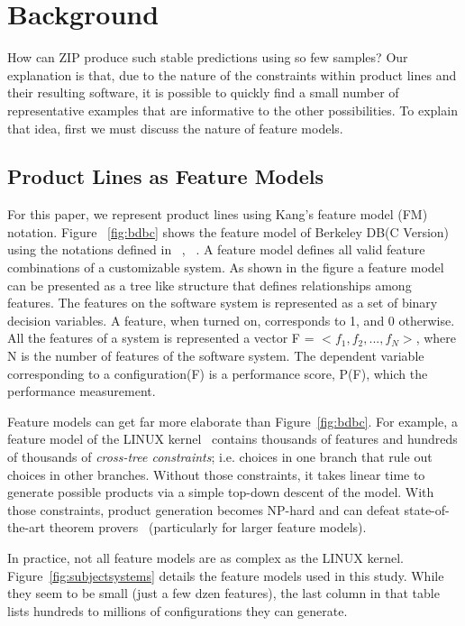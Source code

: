 \documentclass{sig-alternative}
\newcommand{\fig}[1]{Figure~\ref{fig:#1}}
\begin{document}
\section{Background} 

How can ZIP produce such stable predictions using so few samples? Our explanation is that,   due to the nature of the constraints within product lines and their resulting software, it is possible to quickly find a small
number of representative examples that are informative to the other possibilities.
To explain that idea, first we must discuss the nature of feature models.

\subsection{Product Lines as Feature Models}
For this paper, we represent product lines using Kang's feature model (FM) notation. Figure ~\ref{fig:bdbc}  shows the feature model of Berkeley DB(C Version) using the notations defined in ~\cite{kang1990feature}, ~\cite{guo2012consistency}. A feature model defines all valid feature combinations of a customizable system. As shown in the figure a feature model can be presented as a tree like structure that defines relationships among features.   The features on the software system is represented as a set of binary decision variables. A feature, when turned on, corresponds to 1, and 0 otherwise. All the features of a system is represented a vector F = $<f_1, f_2, ...,f_N>$, where N is the number of features of the software system. The dependent variable corresponding to a configuration(F) is a performance score, P(F), which the performance measurement.
    
    
Feature models can get far more elaborate than \fig{bdbc}. For example,
a feature model of the LINUX kernel~\cite{sayyad13b} contains thousands of features and hundreds of thousands of  {\em cross-tree constraints}; i.e. choices in one branch that rule out choices in other branches. 
Without those constraints, it takes linear time to generate possible products via a simple
top-down descent of the model. With those constraints, product generation becomes NP-hard and can
 defeat state-of-the-art theorem provers~\cite{pohl11} (particularly for larger feature models).
 
 
 
In practice, not all feature models are as complex as the LINUX kernel.
\fig{subjectsystems} details the feature models used in this study. While
they seem to be small (just a few dzen features), the last column in that table lists hundreds
to millions of configurations they can generate.
\end{document}
